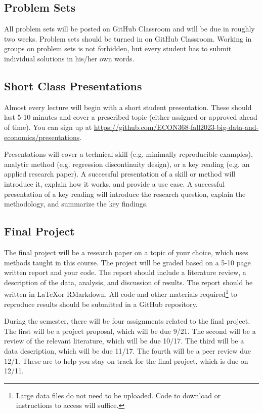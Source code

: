 \documentclass[11pt]{article}
\begin{document}
\subsection*{Problem Sets}

All problem sets will be posted on GitHub Classroom and will be due in roughly two weeks. Problem sets should be turned in on GitHub Classroom. Working in groups on problem sets is not forbidden, but every student has to submit individual solutions in his/her own words.

\subsection*{Short Class Presentations}

Almost every lecture will begin with a short student presentation. These should last 5-10 minutes and cover a prescribed topic (either assigned or approved ahead of time). You can sign up at \url{https://github.com/ECON368-fall2023-big-data-and-economics/presentations}.

Presentations will cover a technical skill (e.g. minimally reproducible examples), analytic method (e.g. regression discontinuity design), or a key reading (e.g. an applied research paper). A successful presentation of a skill or method will introduce it, explain how it works, and provide a use case. A successful presentation of a key reading will introduce the research question, explain the methodology, and summarize the key findings.

\subsection*{Final Project}

The final project will be a research paper on a topic of your choice, which uses methods taught in this course. The project will be graded based on a 5-10 page written report and your code. The report should include a literature review, a description of the data, analysis, and discussion of results. The report should be written in \LaTeX or RMarkdown. All code and other materials required\footnote{Large data files do not need to be uploaded. Code to download or instructions to access will suffice.} to reproduce results should be submitted in a GitHub repository.

During the semester, there will be four assignments related to the final project. The first will be a project proposal, which will be due 9/21. The second will be a review of the relevant literature, which will be due 10/17. The third will be a data description, which will be due 11/17. The fourth will be a peer review due 12/1. These are to help you stay on track for the final project, which is due on 12/11. 
\end{document}
